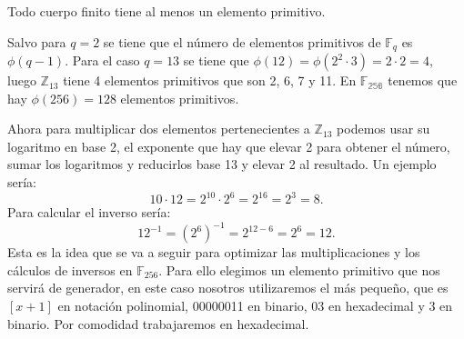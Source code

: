 \begin{teorema}
	Todo cuerpo finito tiene al menos un elemento primitivo.
\end{teorema}
Salvo para $q=2$ se tiene que el número de elementos primitivos de $\mathbb{F}_q$ es $\phi(q-1)$. Para el caso $q=13$ se tiene que $\phi(12)=\phi(2^2\cdot 3)=2\cdot2=4$, luego $\mathbb{Z}_13$ tiene 4 elementos primitivos que son 2, 6, 7 y 11. En $\mathbb{F_{256}}$ tenemos que hay $\phi(256)=128$ elementos primitivos.

Ahora para multiplicar dos elementos pertenecientes a $\mathbb{Z}_{13}$ podemos usar su logaritmo en base 2, el exponente que hay que elevar 2 para obtener el número, sumar los logaritmos y reducirlos base 13 y elevar 2 al resultado. Un ejemplo sería:
$$
	10\cdot12=2^{10}\cdot2^{6}=2^{16}=2^3=8.
$$
Para calcular el inverso sería:
$$
	12^{-1}=(2^6)^{-1}=2^{12-6}=2^6=12.
$$
Esta es la idea que se va a seguir para optimizar las multiplicaciones y los cálculos de inversos en $\mathbb{F}_{256}$. Para ello elegimos un elemento primitivo que nos servirá de generador, en este caso nosotros utilizaremos el más pequeño, que es $[x+1]$ en notación polinomial, 00000011 en binario, 03 en hexadecimal y 3 en binario. Por comodidad trabajaremos en hexadecimal. 

